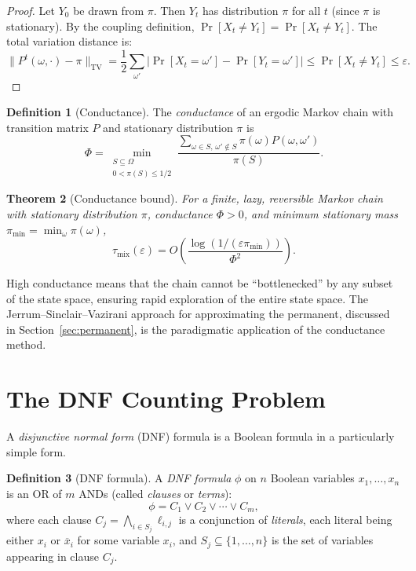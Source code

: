 \documentclass[twoside,12pt]{book}
\theoremstyle{plain}
\newtheorem{theorem}{Theorem}[chapter]
\theoremstyle{definition}
\newtheorem{definition}[theorem]{Definition}
\theoremstyle{remark}
\begin{document}
\begin{proof}
Let $Y_0$ be drawn from $\pi$. Then $Y_t$ has distribution $\pi$ for all $t$ (since $\pi$ is stationary). By the coupling definition, $\Pr[X_t \neq Y_t] = \Pr[X_t \neq Y_t]$. The total variation distance is:
\[
\bigl\| P^t(\omega, \cdot) - \pi \bigr\|_{\mathrm{TV}} = \frac{1}{2} \sum_{\omega'} \bigl| \Pr[X_t = \omega'] - \Pr[Y_t = \omega'] \bigr| \leq \Pr[X_t \neq Y_t] \leq \varepsilon.
\]
\end{proof}

\begin{definition}[Conductance]
The \emph{conductance} of an ergodic Markov chain with transition matrix $P$ and stationary distribution $\pi$ is
\[
\Phi = \min_{\substack{S \subseteq \Omega \\ 0 < \pi(S) \leq 1/2}} \frac{\sum_{\omega \in S, \, \omega' \notin S} \pi(\omega) P(\omega, \omega')}{\pi(S)}.
\]
\end{definition}

\begin{theorem}[Conductance bound]
\label{thm:conductance}
For a finite, lazy, reversible Markov chain with stationary distribution
$\pi$, conductance $\Phi>0$, and minimum stationary mass
$\pi_{\min}=\min_{\omega}\pi(\omega)$,
\[
\tau_{\mathrm{mix}}(\varepsilon)
=O\!\left(\frac{\log(1/(\varepsilon\pi_{\min}))}{\Phi^2}\right).
\]
\end{theorem}

High conductance means that the chain cannot be ``bottlenecked'' by any subset of the state space, ensuring rapid exploration of the entire state space. The Jerrum--Sinclair--Vazirani approach for approximating the permanent, discussed in Section~\ref{sec:permanent}, is the paradigmatic application of the conductance method.

\section{The DNF Counting Problem}
\label{sec:dnf}

A \emph{disjunctive normal form} (DNF) formula is a Boolean formula in a particularly simple form.

\begin{definition}[DNF formula]
A \emph{DNF formula} $\phi$ on $n$ Boolean variables $x_1, \ldots, x_n$ is an OR of $m$ ANDs (called \emph{clauses} or \emph{terms}):
\[
\phi = C_1 \lor C_2 \lor \cdots \lor C_m,
\]
where each clause $C_j = \bigwedge_{i \in S_j} \ell_{i,j}$ is a conjunction of \emph{literals}, each literal being either $x_i$ or $\overline{x}_i$ for some variable $x_i$, and $S_j \subseteq \{1, \ldots, n\}$ is the set of variables appearing in clause $C_j$.
\end{definition}
\end{document}
